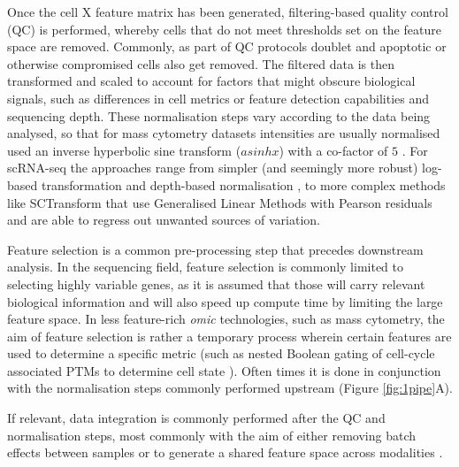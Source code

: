 Once the cell X feature matrix has been generated, filtering-based quality control (QC) is performed, whereby cells that do not meet thresholds set on the feature space are removed. Commonly, as part of QC protocols doublet and apoptotic or otherwise compromised cells also get removed.
The filtered data is then transformed and scaled to account for factors that might obscure biological signals, such as differences in cell metrics or feature detection capabilities and sequencing depth. These normalisation steps vary according to the data being analysed, so that for mass cytometry datasets intensities are usually normalised used an inverse hyperbolic sine transform (\(asinh x\)) with a co-factor of \(5\) \cite{bendall_single-cell_2011,guldberg_computational_2023}. For scRNA-seq the approaches range from simpler (and seemingly more robust) log-based transformation \cite{ahlmann-eltze_comparison_2023} and depth-based normalisation \cite{booeshaghi_depth_2022}, to more complex methods like SCTransform \cite{hafemeister_normalization_2019} that use Generalised Linear Methods with Pearson residuals and are able to regress out unwanted sources of variation.

Feature selection is a common pre-processing step that precedes downstream analysis. In the sequencing field, feature selection is commonly limited to selecting highly variable genes, as it is assumed that those will carry relevant biological information and will also speed up compute time by limiting the large feature space. In less feature-rich \emph{omic} technologies, such as mass cytometry, the aim of feature selection is rather a temporary process wherein certain features are used to determine a specific metric (such as nested Boolean gating of cell-cycle associated PTMs to determine cell state \cite{behbehani_single-cell_2012,qin_cell-type-specific_2020}). Often times it is done in conjunction with the normalisation steps commonly performed upstream (Figure \ref{fig:1pipe}A).

If relevant, data integration is commonly performed after the QC and normalisation steps, most commonly with the aim of either removing batch effects between samples or to generate a shared feature space across modalities \cite{cao_multi-omics_2022}. 

